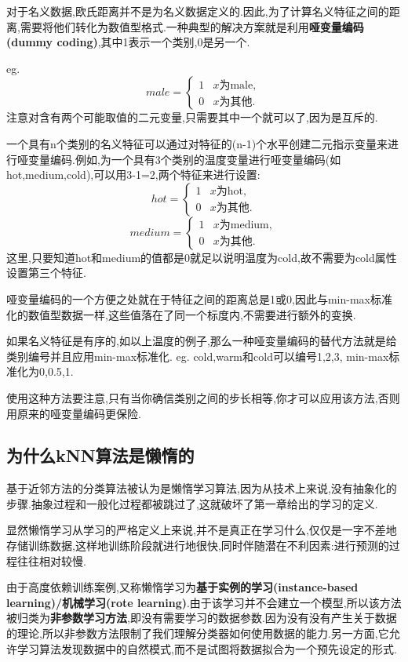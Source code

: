 \documentclass[11pt,a4paper,oneside]{book}
\begin{document}
对于名义数据,欧氏距离并不是为名义数据定义的.因此,为了计算名义特征之间的距离,需要将他们转化为数值型格式.一种典型的解决方案就是利用\textbf{哑变量编码(dummy coding)},其中1表示一个类别,0是另一个.

eg.$$male =
\begin{cases}
	1 &  x \text{为male} ,\\
	0 &  x \text{为其他} .
\end{cases}$$
注意对含有两个可能取值的二元变量,只需要其中一个就可以了,因为是互斥的.

一个具有n个类别的名义特征可以通过对特征的(n-1)个水平创建二元指示变量来进行哑变量编码.例如,为一个具有3个类别的温度变量进行哑变量编码(如hot,medium,cold),可以用3-1=2,两个特征来进行设置:
$$hot =
\begin{cases}
	1 &  x \text{为hot} ,\\
	0 &  x \text{为其他} .
\end{cases}$$
$$medium =
\begin{cases}
	1 &  x \text{为medium} ,\\
	0 &  x \text{为其他} .
\end{cases}$$
这里,只要知道hot和medium的值都是0就足以说明温度为cold,故不需要为cold属性设置第三个特征.

哑变量编码的一个方便之处就在于特征之间的距离总是1或0,因此与min-max标准化的数值型数据一样,这些值落在了同一个标度内,不需要进行额外的变换.
\begin{tcolorbox}[colback=pink!10!white,colframe=pink!100!black]
如果名义特征是有序的,如以上温度的例子,那么一种哑变量编码的替代方法就是给类别编号并且应用min-max标准化.
eg. cold,warm和cold可以编号1,2,3, min-max标准化为0,0.5,1.

使用这种方法要注意,只有当你确信类别之间的步长相等,你才可以应用该方法,否则用原来的哑变量编码更保险.
\end{tcolorbox}
\subsection{为什么kNN算法是懒惰的}
基于近邻方法的分类算法被认为是懒惰学习算法,因为从技术上来说,没有抽象化的步骤.抽象过程和一般化过程都被跳过了,这就破坏了第一章给出的学习的定义.

显然懒惰学习从学习的严格定义上来说,并不是真正在学习什么,仅仅是一字不差地存储训练数据,这样地训练阶段就进行地很快,同时伴随潜在不利因素:进行预测的过程往往相对较慢.

由于高度依赖训练案例,又称懒惰学习为\textbf{基于实例的学习(instance-based learning)/机械学习(rote learning)}.由于该学习并不会建立一个模型,所以该方法被归类为\textbf{非参数学习方法},即没有需要学习的数据参数.因为没有没有产生关于数据的理论,所以非参数方法限制了我们理解分类器如何使用数据的能力.另一方面,它允许学习算法发现数据中的自然模式,而不是试图将数据拟合为一个预先设定的形式.
\end{document}
